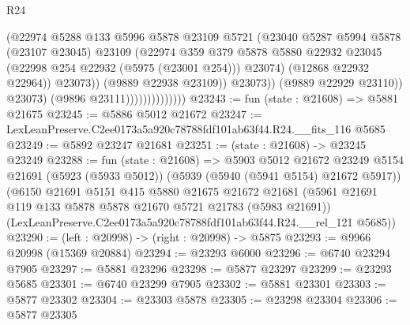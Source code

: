 \begin{lexlean}{R24}
\begin{coremodule}
                                          (@22974
                                            @5288
                                            @133
                                            @5996
                                            @5878
                                            @23109
                                            @5721
                                            (@23040
                                              @5287
                                              @5994
                                              @5878
                                              (@23107 @23045)
                                              @23109
                                              (@22974
                                                @359
                                                @379
                                                @5878
                                                @5880
                                                @22932
                                                @23045
                                                (@22998 @254 @22932 (@5975 (@23001 @254)))
                                                @23074)
                                              (@12868 @22932 @22964))
                                            @23073))
                                        (@9889 @22938 @23109))
                                      @23073))
                                  (@9889 @22929 @23110))
                                @23073)
                              (@9896 @23111))))))))))))))
@23243 := fun (state : @21608) => @5881 @21675
@23245 := @5886 @5012 @21672
@23247 := LexLeanPreserve.C2ee0173a5a920c78788fdf101ab63f44.R24.__fits_116 @5685
@23249 := @5892 @23247 @21681
@23251 := (state : @21608) -> @23245 @23249
@23288 := fun (state : @21608) =>
  @5903
    @5012
    @21672
    @23249
    @5154
    @21691
    (@5923 (@5933 @5012))
    (@5939 (@5940 (@5941 @5154) @21672 @5917))
    (@6150
      @21691
      @5151
      @415
      @5880
      @21675
      @21672
      @21681
      (@5961 @21691 @119 @133 @5878 @5878 @21670 @5721 @21783 (@5983 @21691))
      (LexLeanPreserve.C2ee0173a5a920c78788fdf101ab63f44.R24.__rel_121 @5685))
@23290 := (left : @20998) -> (right : @20998) -> @5875
@23293 := @9966 @20998 (@15369 @20884)
@23294 := @23293 @6000
@23296 := @6740 @23294 @7905
@23297 := @5881 @23296
@23298 := @5877 @23297
@23299 := @23293 @5685
@23301 := @6740 @23299 @7905
@23302 := @5881 @23301
@23303 := @5877 @23302
@23304 := @23303 @5878
@23305 := @23298 @23304
@23306 := @5877 @23305

\end{coremodule}
\end{lexlean}
